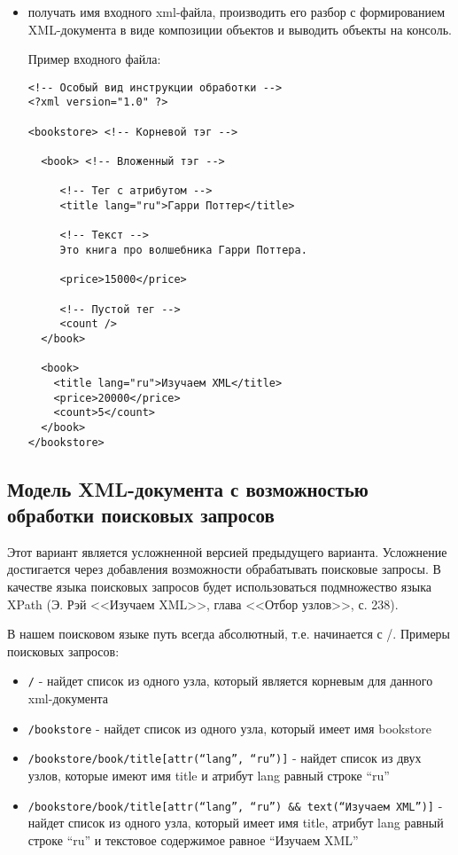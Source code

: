 \documentclass[a4paper,12pt]{article}
\begin{document}
\begin{itemize}
\item получать имя входного xml-файла, производить его разбор с
  формированием XML-документа в виде композиции объектов и выводить
  объекты на консоль.

  Пример входного файла:

\begin{verbatim}
<!-- Особый вид инструкции обработки -->
<?xml version="1.0" ?>

<bookstore> <!-- Корневой тэг -->

  <book> <!-- Вложенный тэг -->

     <!-- Тег с атрибутом -->
     <title lang="ru">Гарри Поттер</title>
     
     <!-- Текст -->
     Это книга про волшебника Гарри Поттера.
  
     <price>15000</price>

     <!-- Пустой тег -->
     <count />
  </book>

  <book>
    <title lang="ru">Изучаем XML</title>
    <price>20000</price>
    <count>5</count>
  </book>
</bookstore>
\end{verbatim}
\end{itemize}

\subsection{Модель XML-документа с возможностью обработки поисковых запросов}

Этот вариант является усложненной версией предыдущего
варианта. Усложнение достигается через добавления возможности
обрабатывать поисковые запросы. В качестве языка поисковых запросов
будет использоваться подмножество языка XPath (Э. Рэй <<Изучаем XML>>,
глава <<Отбор узлов>>, с. 238).

В нашем поисковом языке путь всегда абсолютный, т.е. начинается с /. Примеры поисковых запросов: 

\begin{itemize}
\item \verb+/+ - найдет список из одного узла, который является
  корневым для данного xml-документа
\item \verb+/bookstore+ - найдет список из одного узла, который имеет
  имя bookstore
\item \verb+/bookstore/book/title[attr(“lang”, “ru”)]+ - найдет список
  из двух узлов, которые имеют имя title и атрибут lang равный строке
  “ru”
\item
  \verb+/bookstore/book/title[attr(“lang”, “ru”) && text(“Изучаем XML”)]+
  - найдет список из одного узла, который имеет имя title, атрибут
  lang равный строке “ru” и текстовое содержимое равное “Изучаем XML”
\end{itemize}
\end{document}
